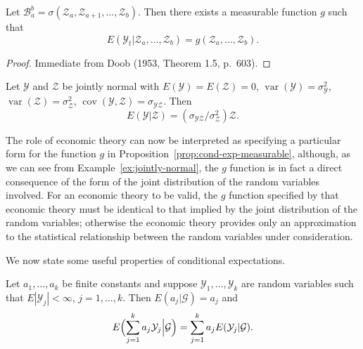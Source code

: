 \begin{proposition}\label{prop:cond-exp-measurable}
Let $\mathcal{B}_a^b = \sigma(\boldsymbol{\mathcal{Z}}_a, \boldsymbol{\mathcal{Z}}_{a+1}, \ldots, \boldsymbol{\mathcal{Z}}_b)$. Then there exists a measurable function $g$ such that
\[
E(\mathcal{Y}_t | \boldsymbol{\mathcal{Z}}_a, \ldots, \boldsymbol{\mathcal{Z}}_b) = g(\boldsymbol{\mathcal{Z}}_a, \ldots, \boldsymbol{\mathcal{Z}}_b).
\]
\end{proposition}

\begin{proof}
Immediate from Doob (1953, Theorem 1.5, p.~603). \qedhere
\end{proof}

\begin{example}\label{ex:jointly-normal}
Let $\mathcal{Y}$ and $\mathcal{Z}$ be jointly normal with $E(\mathcal{Y}) = E(\mathcal{Z}) = 0$, $\operatorname{var}(\mathcal{Y}) = \sigma_\mathcal{Y}^2$, $\operatorname{var}(\mathcal{Z}) = \sigma_\mathcal{Z}^2$, $\operatorname{cov}(\mathcal{Y}, \mathcal{Z}) = \sigma_{\mathcal{Y}\mathcal{Z}}$. Then
\[
E(\mathcal{Y}|\mathcal{Z}) = (\sigma_{\mathcal{Y}\mathcal{Z}} / \sigma_\mathcal{Z}^2) \mathcal{Z}.
\]
\end{example}

The role of economic theory can now be interpreted as specifying a particular form for the function $g$ in Proposition~\ref{prop:cond-exp-measurable}, although, as we can see from Example~\ref{ex:jointly-normal}, the $g$ function is in fact a direct consequence of the form of the joint distribution of the random variables involved. For an economic theory to be valid, the $g$ function specified by that economic theory must be identical to that implied by the joint distribution of the random variables; otherwise the economic theory provides only an approximation to the statistical relationship between the random variables under consideration.

We now state some useful properties of conditional expectations.

\begin{proposition}\label{prop:cond-exp-linearity}
Let $a_1, \ldots, a_k$ be finite constants and suppose $\mathcal{Y}_1, \ldots, \mathcal{Y}_k$ are random variables such that $E|\mathcal{Y}_j| < \infty$, $j = 1, \ldots, k$. Then $E(a_j | \mathcal{G}) = a_j$ and
\[
E\Bigl(\sum_{j=1}^{k} a_j \mathcal{Y}_j \Big| \mathcal{G}\Bigr) = \sum_{j=1}^{k} a_j E(\mathcal{Y}_j | \mathcal{G}).
\]
\end{proposition}

